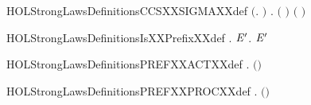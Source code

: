 \begin{SaveVerbatim}{HOLStrongLawsDefinitionsCCSXXSIGMAXXdef}
\HOLTokenTurnstile{} \ensuremath{(}\HOLSymConst{\HOLTokenForall{}}. \HOLConst{\HOLTokenSum{}}   \HOLSymConst{\ensuremath{=}}  \ensuremath{)} \HOLSymConst{\HOLTokenConj{}} \HOLSymConst{\HOLTokenForall{}} . \HOLConst{\HOLTokenSum{}}  \ensuremath{(} \ensuremath{)} \HOLSymConst{\ensuremath{=}} \HOLConst{\HOLTokenSum{}}   \HOLSymConst{\ensuremath{+}}  \ensuremath{(} \ensuremath{)}
\end{SaveVerbatim}
\newcommand{\HOLStrongLawsDefinitionsCCSXXSIGMAXXdef}{\UseVerbatim{HOLStrongLawsDefinitionsCCSXXSIGMAXXdef}}
\begin{SaveVerbatim}{HOLStrongLawsDefinitionsIsXXPrefixXXdef}
\HOLTokenTurnstile{} \HOLSymConst{\HOLTokenForall{}}.   \HOLSymConst{\HOLTokenEquiv{}} \HOLSymConst{\HOLTokenExists{}} \ensuremath{\HOLBoundVar{E}\sp{\prime{}}}.  \HOLSymConst{\ensuremath{=}} \HOLSymConst{\ensuremath{\ldotp}}\ensuremath{\HOLBoundVar{E}\sp{\prime{}}}
\end{SaveVerbatim}
\newcommand{\HOLStrongLawsDefinitionsIsXXPrefixXXdef}{\UseVerbatim{HOLStrongLawsDefinitionsIsXXPrefixXXdef}}
\begin{SaveVerbatim}{HOLStrongLawsDefinitionsPREFXXACTXXdef}
\HOLTokenTurnstile{} \HOLSymConst{\HOLTokenForall{}} .  \ensuremath{(}\HOLSymConst{\ensuremath{\ldotp}}\ensuremath{)} \HOLSymConst{\ensuremath{=}} 
\end{SaveVerbatim}
\newcommand{\HOLStrongLawsDefinitionsPREFXXACTXXdef}{\UseVerbatim{HOLStrongLawsDefinitionsPREFXXACTXXdef}}
\begin{SaveVerbatim}{HOLStrongLawsDefinitionsPREFXXPROCXXdef}
\HOLTokenTurnstile{} \HOLSymConst{\HOLTokenForall{}} .  \ensuremath{(}\HOLSymConst{\ensuremath{\ldotp}}\ensuremath{)} \HOLSymConst{\ensuremath{=}} 
\end{SaveVerbatim}
\newcommand{\HOLStrongLawsDefinitionsPREFXXPROCXXdef}{\UseVerbatim{HOLStrongLawsDefinitionsPREFXXPROCXXdef}}
